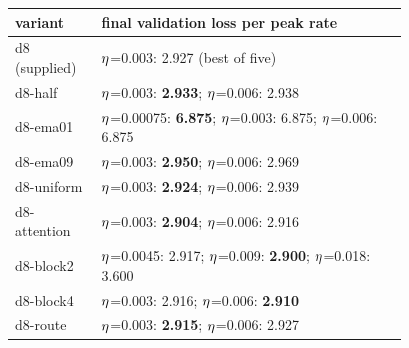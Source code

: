 \begin{tabular}{lp{0.78\linewidth}}\toprule
variant & final validation loss per peak rate\\\midrule
d8 (supplied) & $\eta$=0.003: 2.927 (best of five) \\
d8-half & $\eta$=0.003: \textbf{2.933}; $\eta$=0.006: 2.938 \\
d8-ema01 & $\eta$=0.00075: \textbf{6.875}; $\eta$=0.003: 6.875; $\eta$=0.006: 6.875 \\
d8-ema09 & $\eta$=0.003: \textbf{2.950}; $\eta$=0.006: 2.969 \\
d8-uniform & $\eta$=0.003: \textbf{2.924}; $\eta$=0.006: 2.939 \\
d8-attention & $\eta$=0.003: \textbf{2.904}; $\eta$=0.006: 2.916 \\
d8-block2 & $\eta$=0.0045: 2.917; $\eta$=0.009: \textbf{2.900}; $\eta$=0.018: 3.600 \\
d8-block4 & $\eta$=0.003: 2.916; $\eta$=0.006: \textbf{2.910} \\
d8-route & $\eta$=0.003: \textbf{2.915}; $\eta$=0.006: 2.927 \\
\bottomrule\end{tabular}
